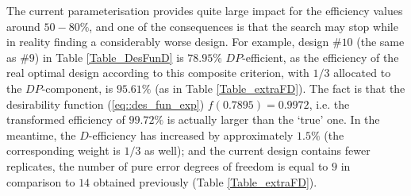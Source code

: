 The current parameterisation provides quite large impact for the efficiency values around $50-80\%$, and one of the consequences is that the search may stop while in reality finding a considerably worse design. For example, design \#$10$ (the same as \#$9$) in Table \ref{Table_DesFunD} is $78.95\%$ $DP$-efficient, as the efficiency of the real optimal design according to this composite criterion, with $1/3$ allocated to the $DP$-component, is $95.61\%$ (as in Table \ref{Table_extraFD}). The fact is that the desirability function (\ref{eq::des_fun_exp}) $f(0.7895)=0.9972$, i.e. the transformed efficiency of $99.72\%$ is actually larger than the `true' one. In the meantime, the $D$-efficiency has increased by approximately $1.5\%$ (the corresponding weight is $1/3$ as well); and the current design contains fewer replicates, the number of pure error degrees of freedom is equal to $9$ in comparison to $14$ obtained previously (Table \ref{Table_extraFD}).

\begin{table}[h]
\centering
\caption{Example 1. Properties of optimal designs in terms of trace-based compound criteria constructed with desirability functions}
\label{Table_DesFunL}
\scalebox{0.8}{
\begin{tabular}{rrrrr|rr|rrrrrr}
\multicolumn{1}{l}{} & \multicolumn{4}{l}{\textbf{Criteria}} & \multicolumn{2}{l}{\textbf{DoF}} & \multicolumn{6}{l}{\textbf{Efficiency, \%}} \\
 & \textbf{L} & \textbf{LP} & \textbf{DF} & \textbf{LoF} & \textbf{PE} & \textbf{LoF} & \textbf{D} & \textbf{DP} & \textbf{L} & \textbf{LP} & \textbf{LoF} & \textbf{DF} \\
1 & 1 & 0 & 0 & 0 & 0 & 19 & 99.03 & 0.00 & 99.61 & 0.00 & 0.00 & 100.00\\
2 & 0 & 1 & 0 & 0 & 13 & 6 & 96.49 & 92.44 & 90.04 & 99.85 & 99.93 & 67.50\\
3 & 0.5 & 0.5 & 0 & 0 & 9 & 10 & 96.91 & 77.74 & 94.53 & 95.61 & 92.86 & 77.50\\
4 & 0.5 & 0 & 0.5 & 0 & 0 & 19 & 99.71 & 0.00 & 99.60 & 0.00 & 0.00 & 100.00 \\
5 & 0.5 & 0 & 0 & 0.5 & 10 & 9 & 96.91 & 82.29 & 93.99 & 97.98 & 96.46 & 75.00 \\
6 & 0 & 0.5 & 0.5 & 0 & 6 & 13 & 98.17 & 59.69 & 96.83 & 83.70 & 73.27 & 85.00\\
7 & 0 & 0.5 & 0 & 0.5 & 13 & 6 & 95.49 & 91.47 & 89.99 & 99.79 & 99.93 & 67.50\\
8 & 0 & 0 & 0.5 & 0.5 & 8 & 11 & 45.20 & 33.80 & 17.06 & 16.60 & 87.94 & 80.00 \\
9 & 1/3 & 1/3 & 1/3 & 0 & 6 & 13 & 98.56 & 59.92 & 96.91 & 83.77 & 73.27 & 85.00\\
10 & 1/3 & 1/3 & 0 & 1/3 & 10 & 9 & 96.91 & 82.29 & 93.99 & 97.98 & 96.46 & 75.00 \\
11 & 0 & 1/3 & 1/3 & 1/3 & 8 & 11 & 96.75 & 72.34 & 95.35 & 92.80 & 87.94 & 80.00 \\
12 & 0.25 & 0.25 & 0.25 & 0.25 & 8 & 11 & 97.99 & 73.27 & 95.41 & 92.87 & 87.94 & 80.00 
\end{tabular}
}
\end{table}
 

